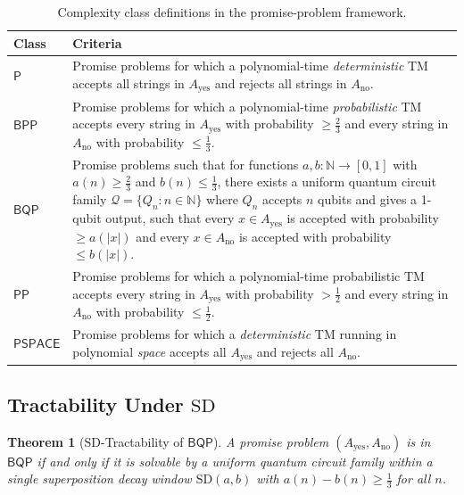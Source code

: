 \documentclass[11pt]{article}
\theoremstyle{plain}
\newtheorem{theorem}{Theorem}[section]
\theoremstyle{definition}
\theoremstyle{remark}
\newcommand{\pspace}{\ensuremath{\mathsf{PSPACE}}}
\newcommand{\bqp}{\ensuremath{\mathsf{BQP}}}
\newcommand{\bpp}{\ensuremath{\mathsf{BPP}}}
\newcommand{\pp}{\ensuremath{\mathsf{PP}}}
\newcommand{\Pcls}{\ensuremath{\mathsf{P}}}
\newcommand{\SD}{\ensuremath{\mathrm{SD}}}   %
\newcommand{\QC}{\ensuremath{\mathcal{Q}}}   %
\newcommand{\Nat}{\mathbb{N}}
\begin{document}
\begin{table}[h]
\centering
\renewcommand{\arraystretch}{1.5}
\begin{tabular}{@{}>{\bfseries}p{1.8cm}p{10.5cm}@{}}
  \toprule
  Class & Criteria \\
  \midrule
  $\Pcls$ &
    Promise problems for which a polynomial-time \emph{deterministic} TM
    accepts all strings in $A_{\text{yes}}$ and rejects all strings in
    $A_{\text{no}}$.
  \\
  $\bpp$ &
    Promise problems for which a polynomial-time \emph{probabilistic} TM
    accepts every string in $A_{\text{yes}}$ with probability $\geq \tfrac{2}{3}$
    and every string in $A_{\text{no}}$ with probability $\leq \tfrac{1}{3}$.
  \\
  $\bqp$ &
    Promise problems such that for functions $a, b : \Nat \to [0,1]$ with
    $a(n) \geq \tfrac{2}{3}$ and $b(n) \leq \tfrac{1}{3}$, there exists a
    uniform quantum circuit family $\QC = \{Q_n : n \in \Nat\}$ where
    $Q_n$ accepts $n$ qubits and gives a 1-qubit output, such that every
    $x \in A_{\text{yes}}$ is accepted with probability $\geq a(|x|)$ and
    every $x \in A_{\text{no}}$ is accepted with probability $\leq b(|x|)$.
  \\
  $\pp$ &
    Promise problems for which a polynomial-time probabilistic TM accepts
    every string in $A_{\text{yes}}$ with probability $> \tfrac{1}{2}$ and
    every string in $A_{\text{no}}$ with probability $\leq \tfrac{1}{2}$.
  \\
  $\pspace$ &
    Promise problems for which a \emph{deterministic} TM running in
    polynomial \emph{space} accepts all $A_{\text{yes}}$ and rejects all
    $A_{\text{no}}$.
  \\
  \bottomrule
\end{tabular}
\caption{Complexity class definitions in the promise-problem framework.}
\label{tab:classes}
\end{table}

\subsection{Tractability Under \SD}

\begin{theorem}[\SD-Tractability of \bqp]
  \label{thm:bqp}
  A promise problem $(A_{\text{yes}}, A_{\text{no}})$ is in $\bqp$ if and
  only if it is solvable by a uniform quantum circuit family within a single
  superposition decay window $\SD(a, b)$ with $a(n) - b(n) \geq \tfrac{1}{3}$
  for all $n$.
\end{theorem}
\end{document}
